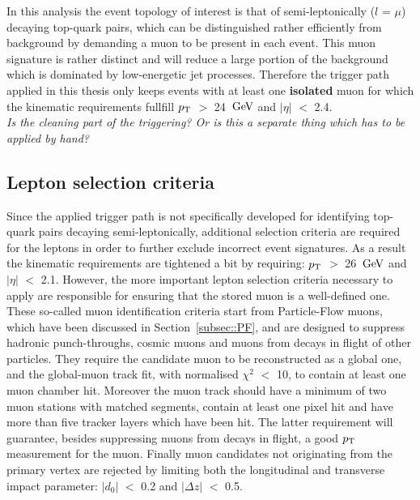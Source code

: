 In this analysis the event topology of interest is that of semi-leptonically ($l$ = $\mu$) decaying top-quark pairs, which can be distinguished rather efficiently from background by demanding a muon to be present in each event. This muon signature is rather distinct and will reduce a large portion of the background which is dominated by low-energetic jet processes.
Therefore the trigger path applied in this thesis only keeps events with at least one \textbf{isolated} muon for which the kinematic requirements fullfill $p_{\rm T}$ $>$ 24 $\, \mathrm{GeV}$ and $\vert \eta \vert$ $<$ 2.4.
\\
\textit{Is the cleaning part of the triggering? Or is this a separate thing which has to be applied by hand?}

\subsection{Lepton selection criteria}
Since the applied trigger path is not specifically developed for identifying top-quark pairs decaying semi-leptonically, additional selection criteria are required for the leptons in order to further exclude incorrect event signatures. As a result the kinematic requirements are tightened a bit by requiring: $p_{\rm T}$ $>$ 26 $\, \mathrm{GeV}$ and $\vert \eta \vert$ $<$ 2.1.
However, the more important lepton selection criteria necessary to apply are responsible for ensuring that the stored muon is a well-defined one.
\\
These so-called muon identification criteria start from Particle-Flow muons, which have been discussed in Section~\ref{subsec::PF}, and are designed to suppress hadronic punch-throughs, cosmic muons and muons from decays in flight of other particles.
They require the candidate muon to be reconstructed as a global one, and the global-muon track fit, with normalised $\chi^{2}$ $<$ 10, to contain at least one muon chamber hit.
Moreover the muon track should have a minimum of two muon stations with matched segments, contain at least one pixel hit and have more than five tracker layers which have been hit. The latter requirement will guarantee, besides suppressing muons from decays in flight, a good $p_{\rm T}$ measurement for the muon.
Finally muon candidates not originating from the primary vertex are rejected by limiting both the longitudinal and transverse impact parameter: $\vert d_0 \vert$ $<$ 0.2 and $\vert \Delta z \vert$ $<$ 0.5.

